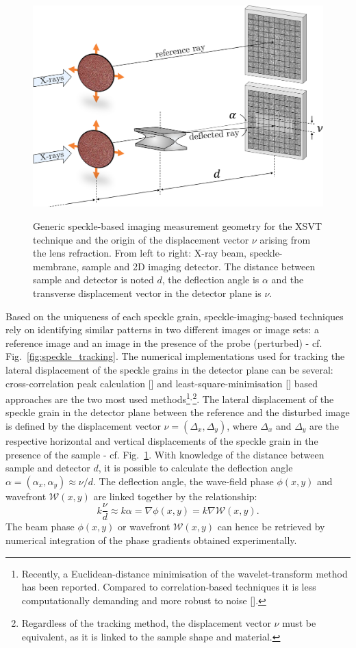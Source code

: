 \begin{refsection}
\begin{figure}[t]
        \centering
        {\includegraphics[width=0.6\linewidth]{figures/ch04/speckle_tracking2.pdf}}
        \caption[Speckle-based imaging geometry]{Generic speckle-based imaging measurement geometry for the XSVT technique and the origin of the displacement vector $\nu$ arising from the lens refraction. From left to right: X-ray beam, speckle-membrane, sample and 2D imaging detector. The distance between sample and detector is noted $d$, the deflection angle is $\alpha$ and the transverse displacement vector in the detector plane is $\nu$.} \label{fig:speckle_tracking2}
\end{figure}

Based on the uniqueness of each speckle grain, speckle-imaging-based techniques rely on identifying similar patterns in two different images or image sets: a reference image and an image in the presence of the probe (perturbed) - cf. Fig.~\ref{fig:speckle_tracking}. The numerical implementations used for tracking the lateral displacement of the speckle grains in the detector plane can be several: cross-correlation peak calculation [\cite{Berujon2012, Morgan2012}] and least-square-minimisation [\cite{Zanette2014, Zdora2017}] based approaches are the two most used methods\footnote{Recently, a Euclidean-distance minimisation of the wavelet-transform method has been reported. Compared to correlation-based techniques it is less computationally demanding and more robust to noise [\cite{Qiao2020b}].}$^{,}$\footnote{Regardless of the tracking method, the displacement vector $\nu$ must be equivalent, as it is linked to the sample shape and material.}. The lateral displacement of the speckle grain in the detector plane between the reference and the disturbed image is defined by the displacement vector $\nu=(\Delta_x,\Delta_y)$, where $\Delta_x$ and $\Delta_y$ are the respective horizontal and vertical displacements of the speckle grain in the presence of the sample - cf. Fig.~\ref{fig:speckle_tracking2}. With knowledge of the distance between sample and detector $d$, it is possible to calculate the deflection angle $\alpha=(\alpha_x,\alpha_y)\approx\nu/d$. The deflection angle, the wave-field phase $\phi(x,y)$ and wavefront $\mathcal{W}(x,y)$ are linked together by the relationship:
\begin{equation}\label{eq:wavefront_gradient}
    k\frac{\nu}{d} \approx k \alpha = \nabla\phi(x,y) = k \nabla\mathcal{W}(x,y).
\end{equation}
The beam phase $\phi(x,y)$ or wavefront $\mathcal{W}(x,y)$ can hence be retrieved by numerical integration of the phase gradients obtained experimentally.


\end{refsection}

